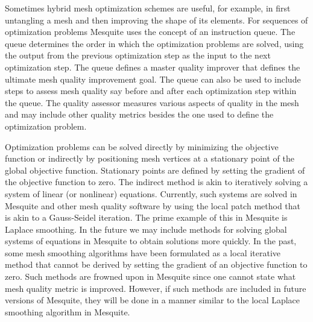 Sometimes hybrid mesh optimization schemes are useful, for example, in
first untangling a mesh and then improving the shape of its elements. For
sequences of optimization problems Mesquite uses the concept of an
instruction queue.  The queue determines the order in which the optimization
problems are solved, using the output from the previous optimization step
as the input to the next optimization step. The queue defines a master
quality improver that defines the ultimate mesh quality improvement goal.
The queue can also be used to include steps to assess mesh quality say
before and after each optimization step within the queue.  The quality
assessor measures various aspects of quality in the mesh and may include
other quality metrics besides the one used to define the optimization problem.
\newline

Optimization problems can be solved directly by minimizing the objective
function or indirectly by positioning mesh vertices at a stationary point
of the global objective function. Stationary points are defined by setting
the gradient of the objective function to zero. The indirect method is akin
to iteratively solving a system of linear (or nonlinear) equations.
Currently, such systems are solved in Mesquite and other mesh quality
software by using the local patch method that is akin
to a Gauss-Seidel iteration. The prime example of this in Mesquite is
Laplace smoothing. In the
future we may include methods for solving global systems of equations
in Mesquite to obtain solutions more quickly.
In the past, some mesh smoothing algorithms have been formulated as a
local iterative method that cannot be derived
by setting the gradient of an objective function to zero. Such methods are
frowned upon in Mesquite since one cannot state what mesh quality metric is
improved.  However, if such methods are included in future versions of Mesquite, they will be done in a manner similar to the local Laplace smoothing
algorithm in Mesquite. \newline

